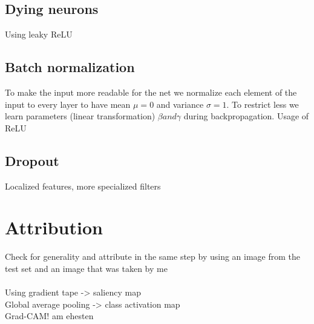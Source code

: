 \documentclass{article}
\begin{document}
\begin{multicols}{2}
\subsection{Dying neurons}
Using leaky ReLU

\subsection{Batch normalization}
To make the input more readable for the net we normalize each element of the input to every layer to have mean $\mu=0$ and variance $\sigma=1$. To restrict less we learn parameters (linear transformation) $\beta and \gamma$ during backpropagation. Usage of ReLU

\subsection{Dropout}
Localized features, more specialized filters

\section{Attribution}

Check for generality and attribute in the same step by using an image from the test set and an image that was taken by me\\
\\
Using gradient tape -> saliency map\\
Global average pooling -> class activation map\\
Grad-CAM! am ehesten

\end{multicols}
\end{document}
